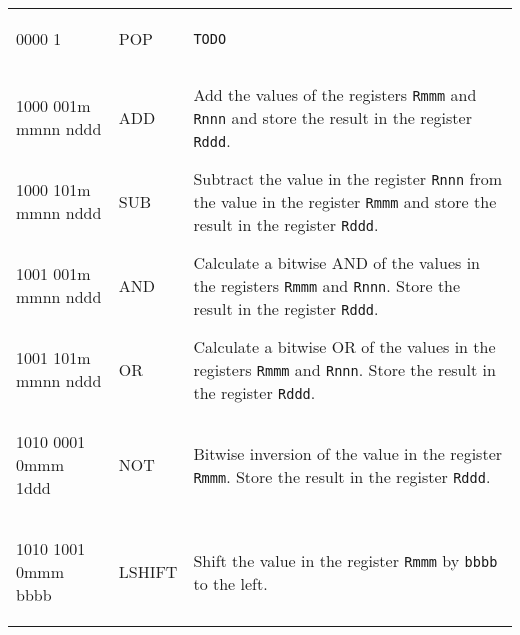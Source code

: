 \documentclass{report}
\newcommand{\boxchar}[1]{\begin{boxednumbers} #1
\end{boxednumbers}}
\begin{document}
\begin{center}
\begin{longtable}{m{}m{}m{}}
        \boxchar{0000 1} & POP       & \texttt{TODO}\\
        &&\\
        \boxchar{1000 001m mmnn nddd} & ADD       & Add the values of the registers
                                                    \texttt{Rmmm} and \texttt{Rnnn} and
                                                    store the result in the register
                                                    \texttt{Rddd}.\\
                                                    \hline
        \boxchar{1000 101m mmnn nddd} & SUB       & Subtract the value in the register
                                                    \texttt{Rnnn} from the value in
                                                    the register \texttt{Rmmm} and store
                                                    the result in the register
                                                    \texttt{Rddd}.\\
                                                    \hline
        \boxchar{1001 001m mmnn nddd} & AND       & Calculate a bitwise AND of the values in
                                                    the registers \texttt{Rmmm}
                                                    and \texttt{Rnnn}. Store the result
                                                    in the register \texttt{Rddd}.\\
                                                    \hline
        \boxchar{1001 101m mmnn nddd} & OR        & Calculate a bitwise OR of the values
                                                    in the registers \texttt{Rmmm} and
                                                    \texttt{Rnnn}. Store the result in
                                                    the register \texttt{Rddd}.\\
                                                    \hline
        \boxchar{1010 0001 0mmm 1ddd} & NOT       & Bitwise inversion of the value in
                                                    the register \texttt{Rmmm}. Store
                                                    the result in the register
                                                    \texttt{Rddd}.\\
                                                    \hline
        \boxchar{1010 1001 0mmm bbbb} & LSHIFT    & Shift the value in the register
                                                    \texttt{Rmmm} by \texttt{bbbb} to
                                                    the left.\\

\end{longtable}
\end{center}
\end{document}
